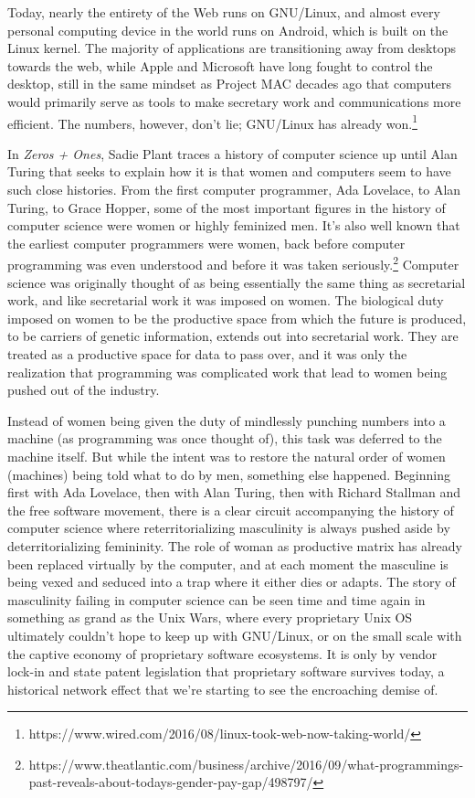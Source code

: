 \documentclass[12pt, a5paper, twoside, openright]{memoir}
\begin{document}
Today, nearly the entirety of the Web runs on GNU/Linux, and almost every personal computing device in the world runs on Android, which is built on the Linux kernel. The majority of applications are transitioning away from desktops towards the web, while Apple and Microsoft have long fought to control the desktop, still in the same mindset as Project MAC decades ago that computers would primarily serve as tools to make secretary work and communications more efficient. The numbers, however, don't lie; GNU/Linux has already won.\footnote{https://www.wired.com/2016/08/linux-took-web-now-taking-world/}

In \textit{Zeros + Ones}, Sadie Plant traces a history of computer science up until Alan Turing that seeks to explain how it is that women and computers seem to have such close histories. From the first computer programmer, Ada Lovelace, to Alan Turing, to Grace Hopper, some of the most important figures in the history of computer science were women or highly feminized men. It's also well known that the earliest computer programmers were women, back before computer programming was even understood and before it was taken seriously.\footnote{https://www.theatlantic.com/business/archive/2016/09/what-programmings-past-reveals-about-todays-gender-pay-gap/498797/} Computer science was originally thought of as being essentially the same thing as secretarial work, and like secretarial work it was imposed on women. The biological duty imposed on women to be the productive space from which the future is produced, to be carriers of genetic information, extends out into secretarial work. They are treated as a productive space for data to pass over, and it was only the realization that programming was complicated work that lead to women being pushed out of the industry.

Instead of women being given the duty of mindlessly punching numbers into a machine (as programming was once thought of), this task was deferred to the machine itself. But while the intent was to restore the natural order of women (machines) being told what to do by men, something else happened. Beginning first with Ada Lovelace, then with Alan Turing, then with Richard Stallman and the free software movement, there is a clear circuit accompanying the history of computer science where reterritorializing masculinity is always pushed aside by deterritorializing femininity. The role of woman as productive matrix has already been replaced virtually by the computer, and at each moment the masculine is being vexed and seduced into a trap where it either dies or adapts. The story of masculinity failing in computer science can be seen time and time again in something as grand as the Unix Wars, where every proprietary Unix OS ultimately couldn't hope to keep up with GNU/Linux, or on the small scale with the captive economy of proprietary software ecosystems. It is only by vendor lock-in and state patent legislation that proprietary software survives today, a historical network effect that we're starting to see the encroaching demise of.
\end{document}
